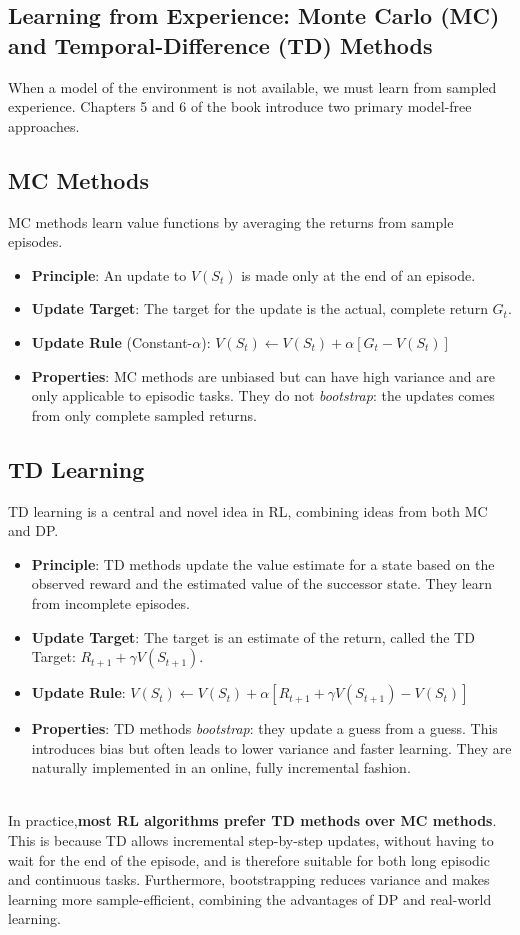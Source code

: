 \subsection{Learning from Experience: Monte Carlo (MC) and Temporal-Difference (TD) Methods}
When a model of the environment is not available, we must learn from sampled experience. Chapters 5 and 6 of the book \cite{Sutton2018} introduce two primary model-free approaches.

\subsection*{MC Methods}
MC methods learn value functions by averaging the returns from sample episodes.
\begin{itemize}
    \item \textbf{Principle}: An update to $V(S_t)$ is made only at the end of an episode.
    \item \textbf{Update Target}: The target for the update is the actual, complete return $G_t$.
    \item \textbf{Update Rule} (Constant-$\alpha$): $V(S_t) \leftarrow V(S_t) + \alpha [G_t - V(S_t)]$
    \item \textbf{Properties}: MC methods are unbiased but can have high variance and are only applicable to episodic tasks. They do not \textit{bootstrap}: the updates comes from only complete sampled returns.
\end{itemize}

\subsection*{TD Learning}
TD learning is a central and novel idea in RL, combining ideas from both MC and DP.
\begin{itemize}
    \item \textbf{Principle}: TD methods update the value estimate for a state based on the observed reward and the estimated value of the successor state. They learn from incomplete episodes.
    \item \textbf{Update Target}: The target is an estimate of the return, called the TD Target: $R_{t+1} + \gamma V(S_{t+1})$.
    \item \textbf{Update Rule}: $V(S_t) \leftarrow V(S_t) + \alpha [R_{t+1} + \gamma V(S_{t+1}) - V(S_t)]$
    \item \textbf{Properties}: TD methods \textit{bootstrap}: they update a guess from a guess. This introduces bias but often leads to lower variance and faster learning. They are naturally implemented in an online, fully incremental fashion.
\end{itemize}
\\
\noindent
In practice,\textbf{most RL algorithms prefer TD methods over MC methods}. This is because TD allows incremental step-by-step updates, without having to wait for the end of the episode, and is therefore suitable for both long episodic and continuous tasks. Furthermore, bootstrapping reduces variance and makes learning more sample-efficient, combining the advantages of DP and real-world learning.


